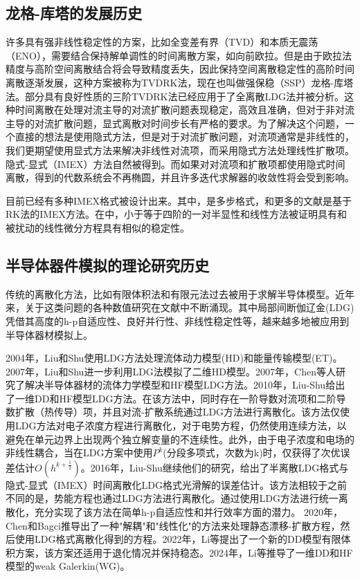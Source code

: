 \subsection{龙格-库塔的发展历史}
许多具有强非线性稳定性的方案，比如全变差有界（TVD）和本质无震荡（ENO），需要结合保持解单调性的时间离散方案，如向前欧拉。但是由于欧拉法精度与高阶空间离散结合将会导致精度丢失，因此保持空间离散稳定性的高阶时间离散逐渐发展\cite{shu1988efficient}，这种方案被称为TVDRK法，现在也叫做强保稳（SSP）龙格-库塔法。部分具有良好性质的三阶TVDRK法\cite{shu2007efficient}已经应用于了全离散LDG法并被分析\cite{wang2013errora}。这种时间离散在处理对流主导的对流扩散问题表现稳定，高效且准确，但对于非对流主导的对流扩散问题，显式离散对时间步长有严格的要求\cite{shu2007efficient}。为了解决这个问题，一个直接的想法是使用隐式方法，但是对于对流扩散问题，对流项通常是非线性的，我们更期望使用显式方法来解决非线性对流项，而采用隐式方法处理线性扩散项。隐式-显式（IMEX）方法自然被得到\cite{ascher1997implicitexplicita}。而如果对对流项和扩散项都使用隐式时间离散，得到的代数系统会不再椭圆，并且许多迭代求解器的收敛性将会受到影响。

目前已经有多种IMEX格式被设计出来。其中，\parencite{ascher1995implicit}是多步格式，\parencite{ascher1997implicitexplicita}和更多的文献是基于RK法的IMEX方法。在\cite{cooper1983additive}中，小于等于四阶的一对半显性和线性方法被证明具有和被扰动的线性微分方程具有相似的稳定性。

\subsection{半导体器件模拟的理论研究历史}
传统的离散化方法，比如有限体积法\cite{bank1983numerical,bank1998finite,chainais2003finite,bessemoulin2012finite}和有限元法\cite{brezzi1989two,mauri20153d}过去被用于求解半导体模型。近年来，关于这类问题的各种数值研究在文献中不断涌现。其中局部间断伽辽金(LDG)凭借其高度的h-p自适应性、良好并行性、非线性稳定性等，越来越多地被应用到半导体器材模拟上。

2004年，Liu和Shu使用LDG方法处理流体动力模型(HD)和能量传输模型(ET)\cite{liu2004locala}。2007年，Liu和Shu进一步利用LDG法模拟了二维HD模型\cite{liu2007localb}。2007年，Chen等人研究了解决半导体器材的流体力学模型和HF模型LDG方法\cite{chen2007discontinuous}。2010年，Liu-Shu给出了一维DD和HF模型LDG方法\cite{liu2010error}。在该方法中，同时存在一阶导数对流项和二阶导数扩散（热传导）项，并且对流-扩散系统通过LDG方法进行离散化。该方法仅使用LDG方法对电子浓度方程进行离散化，对于电势方程，仍然使用连续方法，以避免在单元边界上出现两个独立解变量的不连续性。此外，由于电子浓度和电场的非线性耦合，当在LDG方案中使用$P^k$(分段多项式，次数为k)时，仅获得了次优误差估计$O(h^{k+\frac{1}{2}})$。2016年，Liu-Shu继续他们的研究，给出了半离散LDG格式与隐式-显式（IMEX）时间离散化LDG格式光滑解的误差估计\cite{liu2016analysis}。该方法相较于之前不同的是，势能方程也通过LDG方法进行离散化。通过使用LDG方法进行统一离散化，充分实现了该方法在简单h-p自适应性和并行效率方面的潜力。
2020年，Chen和Bagci推导出了一种"解耦"和"线性化"的方法来处理静态漂移-扩散方程，然后使用LDG格式离散化得到的方程\cite{chen2020steady}。2022年，Li等提出了一个新的DD模型有限体积方案，该方案还适用于退化情况并保持稳态\cite{li2022stabilized}。2024年，Li等推导了一维DD和HF模型的weak Galerkin(WG)。


